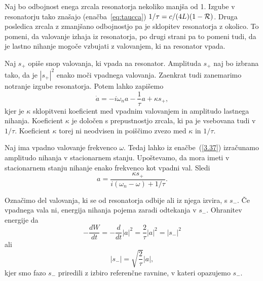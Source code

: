 Naj bo odbojnost enega zrcala resonatorja nekoliko manjša od 1. Izgube v resonatorju 
tako znašajo (enačba~\ref{eq:taucca}) $1/\tau=c/(4L)(1-{\cal R})$. Druga posledica
zrcala z zmanjšano odbojnostjo pa je sklopitev resonatorja z okolico. To pomeni, 
da valovanje izhaja iz resonatorja, po drugi strani pa to pomeni tudi, da je 
lastno nihanje mogoče vzbujati z valovanjem, ki na resonator vpada.

Naj $s_{+}$ opiše snop valovanja, ki vpada na resonator. Amplituda $s_{+}$
naj bo izbrana tako, da je $|s_{+}|^{2}$ enako moči vpadnega valovanja. Zaenkrat
tudi zanemarimo notranje izgube resonatorja. Potem lahko
zapišemo 
\begin{equation}
\dot{a}=-i\omega_{n}a-\frac{1}{\tau}a+\kappa s_{+},
\label{3.37}
\end{equation}
kjer je $\kappa$ sklopitveni koeficient med vpadnim valovanjem in
amplitudo lastnega nihanja. Koeficient $\kappa$ je določen
s prepustnostjo zrcala, ki pa je vsebovana tudi v $1/\tau$. Koeficient
$\kappa$ torej ni neodvisen in poiščimo zvezo med $\kappa$ in $1/\tau$.

Naj ima vpadno valovanje frekvenco $\omega$. Tedaj lahko iz enačbe~(\ref{3.37}) 
izračunamo amplitudo nihanja v stacionarnem stanju. Upoštevamo, 
da mora imeti v stacionarnem stanju nihanje enako frekvenco
kot vpadni val. Sledi 
\begin{equation}
a=\frac{\kappa s_{+}}{i(\omega_{n}-\omega)+1/\tau}.
\label{3.38}
\end{equation}
 
Označimo del valovanja, ki se od resonatorja odbije ali iz njega izvira, s $s_{-}$.
Če vpadnega vala ni, energija nihanja pojema zaradi odtekanja v $s_{-}$.
Ohranitev energije da 
\begin{equation}
-\frac{dW}{dt}=-\frac{d}{dt}|a|^{2}=\frac{2}{\tau}|a|^{2}=|s_{-}|^{2}
\label{3.39}
\end{equation}
ali 
\begin{equation}
|s_{-}|=\sqrt{\frac{2}{\tau}}|a|,
\label{3.40}
\end{equation}
kjer smo fazo $s_{-}$ priredili z izbiro referenčne ravnine, v kateri
opazujemo $s_{-}$.

